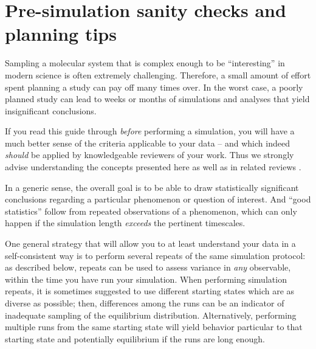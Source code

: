 \section{Pre-simulation sanity checks and planning tips}
\label{sec:sanity}

Sampling a molecular system that is complex enough to be ``interesting'' in modern science is often extremely challenging.
Therefore, a small amount of effort spent planning a study can pay off many times over.  In the worst case, a poorly planned study can lead to weeks or months of simulations and analyses that yield insignificant conclusions.

If you read this guide through \emph{before} performing a simulation, you will have a much better sense of the criteria applicable to your data -- and which indeed \emph{should} be applied by knowledgeable reviewers of your work.
Thus we strongly advise understanding the concepts presented here as well as in related reviews \cite{Grossfield2009,JCGM:GUM2008}.

In a generic sense, the overall goal is to be able to draw statistically significant conclusions regarding a particular phenomenon or question of interest.
And ``good statistics'' follow from repeated observations of a phenomenon, which can only happen if the simulation length \emph{exceeds} the pertinent timescales.

One general strategy that will allow you to at least understand your data in a self-consistent way is to perform several repeats of the same simulation protocol: as described below, repeats can be used to assess variance in \emph{any} observable, within the time you have run your simulation.
When performing simulation repeats, it is sometimes suggested to use different starting states which are as diverse as possible; then, differences among the runs can be an indicator of inadequate sampling of the equilibrium distribution.
Alternatively, performing multiple runs from the same starting state will yield behavior particular to that starting state and potentially equilibrium if the runs are long enough.

